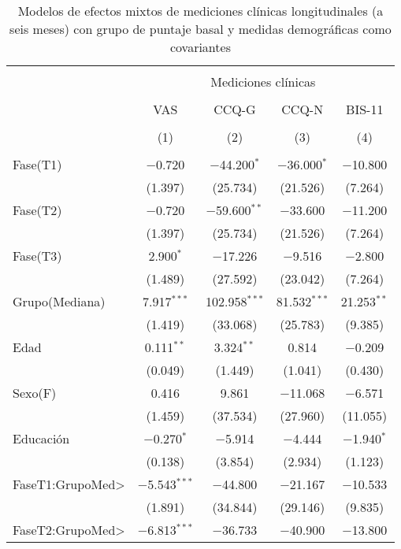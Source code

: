 \begin{table}[!hbtp] \centering
    \small
  \caption{Modelos de efectos mixtos de mediciones clínicas longitudinales (a seis meses) con grupo de puntaje basal y medidas demográficas como covariantes}
  \label{tab:clin3}
\begin{tabular}{@{\extracolsep{5pt}}lcccc}
\\[-1.8ex]\hline
\hline \\[-1.8ex]
 & \multicolumn{4}{c}{Mediciones clínicas } \\
\cline{2-5}
\\[-1.8ex] & VAS & CCQ-G & CCQ-N & BIS-11\\
\\[-1.8ex] & (1) & (2) & (3) & (4)\\
\hline \\[-1.8ex]
  Fase(T1) & $-$0.720 & $-$44.200$^{*}$ & $-$36.000$^{*}$ & $-$10.800 \\
  & (1.397) & (25.734) & (21.526) & (7.264) \\
  Fase(T2) & $-$0.720 & $-$59.600$^{**}$ & $-$33.600 & $-$11.200 \\
  & (1.397) & (25.734) & (21.526) & (7.264) \\
  Fase(T3) & 2.900$^{*}$ & $-$17.226 & $-$9.516 & $-$2.800 \\
  & (1.489) & (27.592) & (23.042) & (7.264) \\
  Grupo(Mediana) & 7.917$^{***}$ & 102.958$^{***}$ & 81.532$^{***}$ & 21.253$^{**}$ \\
  & (1.419) & (33.068) & (25.783) & (9.385) \\
  Edad & 0.111$^{**}$ & 3.324$^{**}$ & 0.814 & $-$0.209 \\
  & (0.049) & (1.449) & (1.041) & (0.430) \\
  Sexo(F) & 0.416 & 9.861 & $-$11.068 & $-$6.571 \\
  & (1.459) & (37.534) & (27.960) & (11.055) \\
  Educación & $-$0.270$^{*}$ & $-$5.914 & $-$4.444 & $-$1.940$^{*}$ \\
  & (0.138) & (3.854) & (2.934) & (1.123) \\
  FaseT1:GrupoMed\textgreater  & $-$5.543$^{***}$ & $-$44.800 & $-$21.167 & $-$10.533 \\
  & (1.891) & (34.844) & (29.146) & (9.835) \\
  FaseT2:GrupoMed\textgreater  & $-$6.813$^{***}$ & $-$36.733 & $-$40.900 & $-$13.800 \\

\end{tabular}
\end{table}
